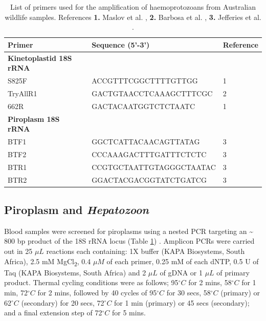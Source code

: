 \documentclass[a4paper, nobind]{templates/ociamthesis}
\begin{document}
\begin{table}

\caption[Primers used for haemoprotozoa detection in samples from ticks and wildlife.]{\label{tab:T4primers}List of primers used for the amplification of haemoprotozoans from Australian wildlife samples. References \textbf{1.} Maslov et al. \autocite*{maslovPhylogenyTrypanosomesInferred1996}, \textbf{2.} Barbosa et al. \autocite*{barbosaIncreasedGeneticDiversity2017}, \textbf{3.} Jefferies et al. \autocite*{jefferiesPCRRFLPDetectionDifferentiation2007}.}
\centering
\fontsize{8.5}{10.5}\selectfont
\begin{tabular}[t]{lll}
\toprule
Primer & Sequence (5'-3') & Reference\\
\midrule
\textbf{Kinetoplastid 18S rRNA} & \textbf{} & \textbf{}\\
S825F & ACCGTTTCGGCTTTTGTTGG & 1\\
TryAllR1 & GACTGTAACCTCAAAGCTTTCGC & 2\\
662R & GACTACAATGGTCTCTAATC & 1\\
\textbf{Piroplasm 18S rRNA} & \textbf{} & \textbf{}\\
BTF1 & GGCTCATTACAACAGTTATAG & 3\\
BTF2 & CCCAAAGACTTTGATTTCTCTC & 3\\
BTR1 & CCGTGCTAATTGTAGGGCTAATAC & 3\\
BTR2 & GGACTACGACGGTATCTGATCG & 3\\
\bottomrule
\end{tabular}
\end{table}

\hypertarget{piroplasm-and-hepatozoon}{%
\subsection{\texorpdfstring{Piroplasm and \emph{Hepatozoon}}{Piroplasm and Hepatozoon}}\label{piroplasm-and-hepatozoon}}

Blood samples were screened for piroplasms using a nested PCR targeting an \textasciitilde{} 800 bp product of the 18S rRNA locus (Table \ref{tab:T4primers}) \autocite{jefferiesPCRRFLPDetectionDifferentiation2007}.
Amplicon PCRs were carried out in 25 \(\mu L\) reactions each containing: 1X buffer (KAPA Biosystems, South Africa), 2.5 mM MgCl\textsubscript{2}, 0.4 \(\mu M\) of each primer, 0.25 mM of each dNTP, 0.5 U of Taq (KAPA Biosystems, South Africa) and 2 \(\mu L\) of gDNA or 1 \(\mu L\) of primary product.
Thermal cycling conditions were as follows; 95\(^\circ C\) for 2 mins, 58\(^\circ C\) for 1 min, 72\(^\circ C\) for 2 mins, followed by 40 cycles of 95\(^\circ C\) for 30 secs, 58\(^\circ C\) (primary) or 62\(^\circ C\) (secondary) for 20 secs, 72\(^\circ C\) for 1 min (primary) or 45 secs (secondary); and a final extension step of 72\(^\circ C\) for 5 mins.
\end{document}

